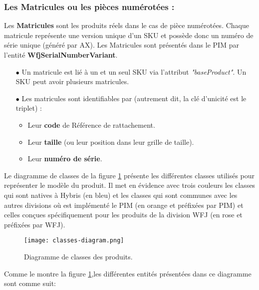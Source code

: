 \subsubsection{Les Matricules ou les pièces numérotées :}

Les \textbf{Matricules} sont les produits réels dans le cas de pièce numérotées. Chaque matricule représente une version unique d'un SKU et possède donc un numéro de série unique (généré par AX). Les Matricules sont présentés dans le PIM par l'entité \textbf{WfjSerialNumberVariant}.
\medskip

\begin{itemize}
    \item[$\bullet$] Un matricule est lié à un et un seul SKU via l'attribut \textit{"baseProduct"}. Un SKU peut avoir plusieurs matricules.
\medskip
    \item[$\bullet$] Les matricules sont identifiables par (autrement dit, la clé d'unicité est le triplet) :
\medskip
    \begin{itemize}
    \smallskip
        \item Leur \textbf{code} de Référence de rattachement.
        \smallskip
        \item Leur \textbf{taille} (ou leur position dans leur grille de taille).
        \smallskip
        \item Leur \textbf{numéro de série}.
    \end{itemize}
\end{itemize}
\medskip

Le diagramme de classes de la figure \ref{fig:classes-diagram} présente les différentes classes utilisés pour représenter le modèle du produit. Il met en évidence avec trois couleurs les classes qui sont natives à Hybris (en bleu) et les classes qui sont communes avec les autres divisions où est implémenté le PIM (en orange et préfixées par PIM) et celles conçues spécifiquement pour les produits de la division WFJ (en rose et préfixées par WFJ).

\begin{figure}[ht]
  \centering
  \texttt{[image: classes-diagram.png]}
  \caption{Diagramme de classes des produits.}
  \label{fig:classes-diagram}
\end{figure}
\FloatBarrier
\medskip

Comme le montre la figure \ref{fig:classes-diagram},les différentes entités présentées dans ce diagramme sont comme suit:

\medskip

